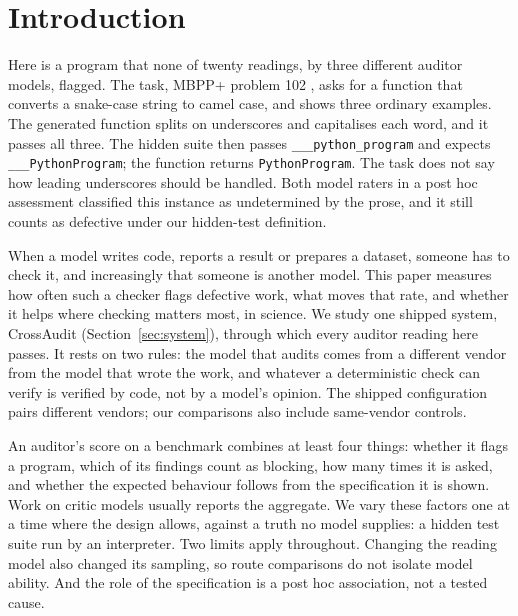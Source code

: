 \section{Introduction}
Here is a program that none of twenty readings, by three different auditor models, flagged. The
task,
MBPP+ problem 102 \citep{liu2023evalplus}, asks for a function that converts a snake-case string to
camel case, and shows three ordinary examples. The generated function splits on underscores and
capitalises each word, and it passes all three. The hidden suite then passes
\verb|___python_program| and expects \verb|___PythonProgram|; the function returns
\verb|PythonProgram|. The task does not say how leading underscores should be handled. Both model
raters in a post hoc assessment classified this instance as undetermined by the prose, and it still
counts as defective under our hidden-test definition.

When a model writes code, reports a result or prepares a dataset, someone has to check it, and
increasingly that someone is another model. This paper measures how often such a checker flags
defective work, what moves that rate, and whether it helps where checking matters most, in science.
We study one shipped system, CrossAudit (Section~\ref{sec:system}), through which every auditor
reading here passes. It rests on two rules: the model that audits comes from a different vendor from
the model that wrote the work, and whatever a deterministic check can verify is verified by code, not
by a model's opinion. The shipped configuration pairs different vendors; our comparisons also
include same-vendor controls.

An auditor's score on a benchmark combines at least four things: whether it flags a program, which
of its findings count as blocking, how many times it is asked, and whether the expected behaviour
follows from the specification it is shown. Work on critic models usually reports the aggregate. We
vary these factors one at a time where the design allows, against a truth no model supplies: a
hidden test suite run by an interpreter. Two limits apply throughout. Changing the reading model also
changed its sampling, so route comparisons do not isolate model ability. And the role of the
specification is a post hoc association, not a tested cause.

